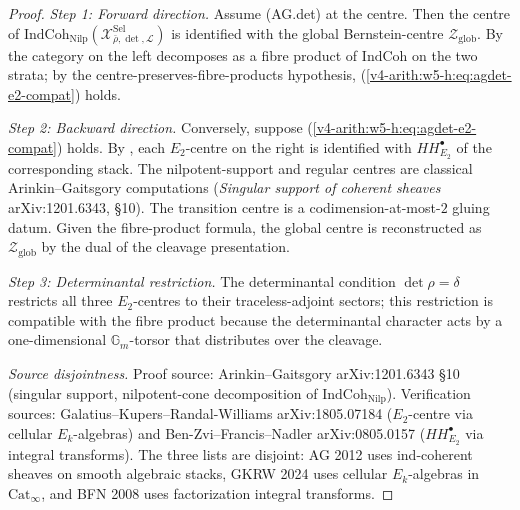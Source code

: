 \begin{proof}
\emph{Step 1: Forward direction.} Assume (AG.det) at the centre.
Then the centre of
\(\mathrm{IndCoh}_{\mathrm{Nilp}}(\mathcal{X}^{\mathrm{Sel}}_{\bar\rho,\det,\mathcal{L}})\)
is identified with the global Bernstein-centre
\(\mathcal{Z}_{\mathrm{glob}}\). By
 the
category on the left decomposes as a fibre product of \(\mathrm{IndCoh}\)
on the two strata; by the centre-preserves-fibre-products hypothesis,
(\ref{v4-arith:w5-h:eq:agdet-e2-compat}) holds.

\emph{Step 2: Backward direction.} Conversely, suppose
(\ref{v4-arith:w5-h:eq:agdet-e2-compat}) holds. By
, each \(E_{2}\)-centre on the
right is identified with \(HH^{\bullet}_{E_{2}}\) of the corresponding
stack. The nilpotent-support and regular centres are classical
Arinkin--Gaitsgory computations (\emph{Singular support of coherent
sheaves} arXiv:1201.6343, \S10). The transition centre is a
codimension-at-most-\(2\) gluing datum. Given the fibre-product
formula, the global centre is reconstructed as
\(\mathcal{Z}_{\mathrm{glob}}\) by the dual of the cleavage presentation.

\emph{Step 3: Determinantal restriction.} The determinantal condition
\(\det\rho=\delta\) restricts all three \(E_{2}\)-centres to their
traceless-adjoint sectors; this restriction is compatible with the
fibre product because the determinantal character acts by a
one-dimensional \(\mathbb{G}_{m}\)-torsor that distributes over the
cleavage.

\emph{Source disjointness.} Proof source: Arinkin--Gaitsgory
arXiv:1201.6343 \S10 (singular support, nilpotent-cone decomposition
of \(\mathrm{IndCoh}_{\mathrm{Nilp}}\)). Verification sources:
Galatius--Kupers--Randal-Williams arXiv:1805.07184
(\(E_{2}\)-centre via cellular \(E_{k}\)-algebras) and
Ben-Zvi--Francis--Nadler arXiv:0805.0157
(\(HH^{\bullet}_{E_{2}}\) via integral transforms). The three lists
are disjoint: AG 2012 uses ind-coherent sheaves on smooth algebraic
stacks, GKRW 2024 uses cellular \(E_{k}\)-algebras in
\(\mathrm{Cat}_{\infty}\), and BFN 2008 uses factorization integral
transforms.
\end{proof}

